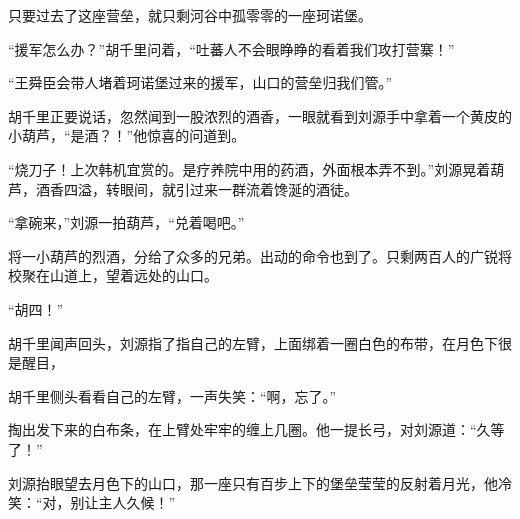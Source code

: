 只要过去了这座营垒，就只剩河谷中孤零零的一座珂诺堡。

“援军怎么办？”胡千里问着，“吐蕃人不会眼睁睁的看着我们攻打营寨！”

“王舜臣会带人堵着珂诺堡过来的援军，山口的营垒归我们管。”

胡千里正要说话，忽然闻到一股浓烈的酒香，一眼就看到刘源手中拿着一个黄皮的小葫芦，“是酒？！”他惊喜的问道到。

“烧刀子！上次韩机宜赏的。是疗养院中用的药酒，外面根本弄不到。”刘源晃着葫芦，酒香四溢，转眼间，就引过来一群流着馋涎的酒徒。

“拿碗来，”刘源一拍葫芦，“兑着喝吧。”

将一小葫芦的烈酒，分给了众多的兄弟。出动的命令也到了。只剩两百人的广锐将校聚在山道上，望着远处的山口。

“胡四！”

胡千里闻声回头，刘源指了指自己的左臂，上面绑着一圈白色的布带，在月色下很是醒目，

胡千里侧头看看自己的左臂，一声失笑：“啊，忘了。”

掏出发下来的白布条，在上臂处牢牢的缠上几圈。他一提长弓，对刘源道：“久等了！”

刘源抬眼望去月色下的山口，那一座只有百步上下的堡垒莹莹的反射着月光，他冷笑：“对，别让主人久候！”


